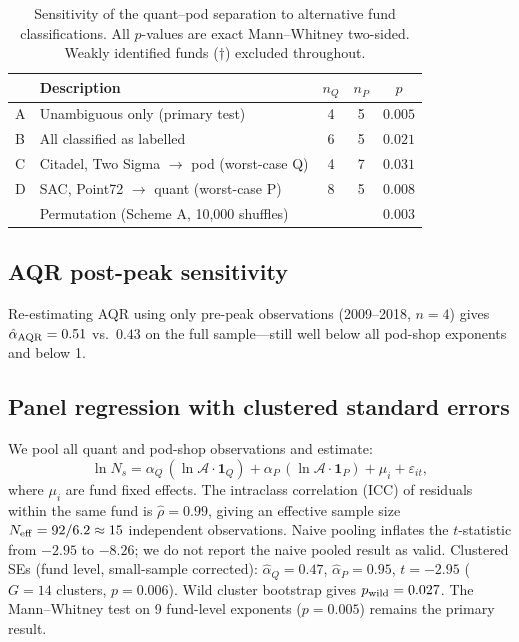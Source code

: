 \documentclass[12pt]{article}
\newcommand{\Ns}{N_{s}}
\newcommand{\Ac}{\mathcal{A}}
\newcommand{\alphahat}{\hat{\alpha}}
\begin{document}
\begin{table}[htbp]
\caption{\label{tab:robust}
  Sensitivity of the quant--pod separation to alternative
  fund classifications.
  All $p$-values are exact Mann--Whitney two-sided.
  Weakly identified funds ($\dagger$) excluded throughout.
}
\setlength{\tabcolsep}{6pt}
\small
\begin{tabular}{@{}llccc@{}}
  \toprule
  & Description & $n_Q$ & $n_P$ & $p$ \\
  \midrule
  A & Unambiguous only (primary test) & 4 & 5 & $0.005$ \\
  B & All classified as labelled       & 6 & 5 & $0.021$ \\
  C & Citadel, Two Sigma $\to$ pod (worst-case Q) & 4 & 7 & $0.031$ \\
  D & SAC, Point72 $\to$ quant (worst-case P)      & 8 & 5 & $0.008$ \\
  \midrule
  & Permutation (Scheme A, 10,000 shuffles) & & & $0.003$ \\
  \bottomrule
\end{tabular}
\end{table}

\subsection{AQR post-peak sensitivity}
\label{sec:aqr}

Re-estimating AQR using only pre-peak observations (2009--2018,
$n{=}4$) gives $\alphahat_{\rm AQR} = 0.51$ vs.\ $0.43$ on
the full sample---still well below all pod-shop exponents
and below 1.

\subsection{Panel regression with clustered standard errors}
\label{sec:panel}

We pool all quant and pod-shop observations and estimate:
\begin{equation}
  \label{eq:panel}
  \ln\Ns = \alpha_Q\,(\ln\Ac \cdot \mathbf{1}_Q) +
            \alpha_P\,(\ln\Ac \cdot \mathbf{1}_P) + \mu_i + \varepsilon_{it},
\end{equation}
where $\mu_i$ are fund fixed effects.
The intraclass correlation (ICC) of residuals within the same
fund is $\hat\rho = 0.99$, giving an effective sample size
$N_{\rm eff} = 92/6.2 \approx 15$ independent observations.
Naive pooling inflates the $t$-statistic from $-2.95$ to
$-8.26$; we do not report the naive pooled result as valid.
Clustered SEs (fund level, small-sample corrected):
$\hat\alpha_Q = 0.47$, $\hat\alpha_P = 0.95$,
$t = -2.95$ ($G{=}14$ clusters, $p = 0.006$).
Wild cluster bootstrap gives $p_{\rm wild} = 0.027$.
The Mann--Whitney test on 9 fund-level exponents ($p = 0.005$)
remains the primary result.
\end{document}
